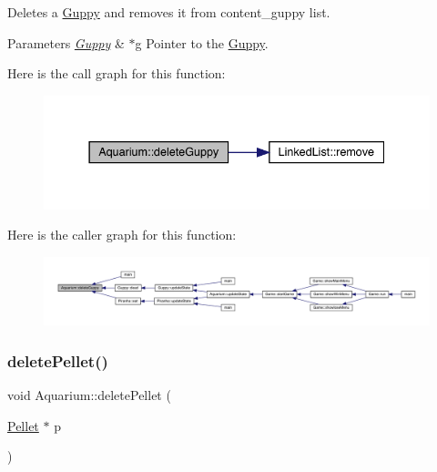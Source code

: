 Deletes a \mbox{\hyperlink{class_guppy}{Guppy}} and removes it from content\+\_\+guppy list. 
\begin{DoxyParams}{Parameters}
{\em \mbox{\hyperlink{class_guppy}{Guppy}}} & $\ast$g Pointer to the \mbox{\hyperlink{class_guppy}{Guppy}}. \\
\hline
\end{DoxyParams}
Here is the call graph for this function\+:\nopagebreak
\begin{figure}[H]
\begin{center}
\leavevmode
\includegraphics[width=337pt]{class_aquarium_ae2372aef40d9474573833262b6062eb2_cgraph}
\end{center}
\end{figure}
Here is the caller graph for this function\+:
\nopagebreak
\begin{figure}[H]
\begin{center}
\leavevmode
\includegraphics[width=350pt]{class_aquarium_ae2372aef40d9474573833262b6062eb2_icgraph}
\end{center}
\end{figure}
\mbox{\label{class_aquarium_a61329fb56bcb5af2e06fc62568456f1b}} 
\subsubsection{\texorpdfstring{delete\+Pellet()}{deletePellet()}}
{\footnotesize\ttfamily void Aquarium\+::delete\+Pellet (\begin{DoxyParamCaption}\item[{\mbox{\hyperlink{class_pellet}{Pellet}} $\ast$}]{p }\end{DoxyParamCaption})}



